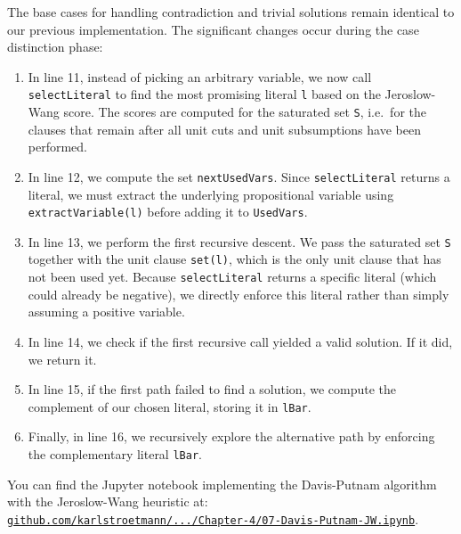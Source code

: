 The base cases for handling contradiction and trivial solutions remain identical to our previous implementation. The significant changes occur during the case distinction phase:
\begin{enumerate}
\item In line 11, instead of picking an arbitrary variable, we now call \texttt{selectLiteral} to find the most
  promising literal \texttt{l} based on the Jeroslow-Wang score.  The scores are computed for the saturated set
  \texttt{S}, i.e.~for the clauses that remain after all unit cuts and unit subsumptions have been performed.
\item In line 12, we compute the set \texttt{nextUsedVars}. Since \texttt{selectLiteral} returns a literal, we must extract the underlying propositional variable using \texttt{extractVariable(l)} before adding it to \texttt{UsedVars}.
\item In line 13, we perform the first recursive descent. We pass the saturated set \texttt{S} together with the
  unit clause \texttt{set(l)}, which is the only unit clause that has not been used yet. Because \texttt{selectLiteral} returns a specific literal (which could already be negative), we directly enforce this literal rather than simply assuming a positive variable.
\item In line 14, we check if the first recursive call yielded a valid solution. If it did, we return it.
\item In line 15, if the first path failed to find a solution, we compute the complement of our chosen literal, storing it in \texttt{lBar}.
\item Finally, in line 16, we recursively explore the alternative path by enforcing the complementary literal \texttt{lBar}.
\end{enumerate}
You can find the Jupyter notebook implementing the Davis-Putnam algorithm with the Jeroslow-Wang heuristic at:
\\[0.2cm]
\hspace*{1.3cm}
\href{https://github.com/karlstroetmann/Logic/blob/master/TypeScript/Chapter-4/07-Davis-Putnam-JW.ipynb}{\texttt{github.com/karlstroetmann/.../Chapter-4/07-Davis-Putnam-JW.ipynb}}.


